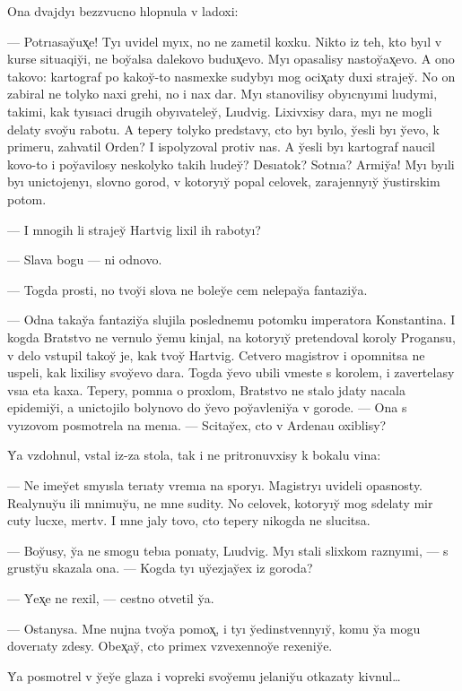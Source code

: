 \documentclass[10pt]{book}
\begin{document}
Ona dvajdyı bezzvucno hlopnula v ladoxi:

— Potrıasay̆ux̨e! Tyı uvidel myıx, no ne zametil koxku. Nikto iz teh, kto byıl v kurse situaqiy̆i, ne boy̆alsa dalekovo budux̨evo. Myı opasalisy nastoy̆ax̨evo. A ono takovo: kartograf po kakoy̆-to nasmexke sudybyı mog ocix̨aty duxi strajey̆. No on zabiral ne tolyko naxi grehi, no i nax dar. Myı stanovilisy obyıcnyımi lıudymi, takimi, kak tyısıaci drugih obyıvateley̆, Lıudvig. Lixivxisy dara, myı ne mogli delaty svoy̆u rabotu. A tepery tolyko predstavy, cto byı byılo, y̆esli byı y̆evo, k primeru, zahvatil Orden? I ispolyzoval protiv nas. A y̆esli byı kartograf naucil kovo-to i poy̆avilosy neskolyko takih lıudey̆? Desıatok? Sotnıa? Armiy̆a! Myı byıli byı unictojenyı, slovno gorod, v kotoryıy̆ popal celovek, zarajennyıy̆ y̆ustirskim potom.

— I mnogih li strajey̆ Hartvig lixil ih rabotyı?

— Slava bogu — ni odnovo.

— Togda prosti, no tvoy̆i slova ne boley̆e cem nelepay̆a fantaziy̆a.

— Odna takay̆a fantaziy̆a slujila poslednemu potomku imperatora Konstantina. I kogda Bratstvo ne vernulo y̆emu kinjal, na kotoryıy̆ pretendoval koroly Progansu, v delo vstupil takoy̆ je, kak tvoy̆ Hartvig. Cetvero magistrov i opomnitsa ne uspeli, kak lixilisy svoy̆evo dara. Togda y̆evo ubili vmeste s korolem, i zavertelasy vsıa eta kaxa. Tepery, pomnıa o proxlom, Bratstvo ne stalo jdaty nacala epidemiy̆i, a unictojilo bolynovo do y̆evo poy̆avleniy̆a v gorode. — Ona s vyızovom posmotrela na menıa. — Scitay̆ex, cto v Ardenau oxiblisy?

Y̆a vzdohnul, vstal iz-za stola, tak i ne pritronuvxisy k bokalu vina:

— Ne imey̆et smyısla terıaty vremıa na sporyı. Magistryı uvideli opasnosty. Realynuy̆u ili mnimuy̆u, ne mne sudity. No celovek, kotoryıy̆ mog sdelaty mir cuty lucxe, mertv. I mne jaly tovo, cto tepery nikogda ne slucitsa.

— Boy̆usy, y̆a ne smogu tebıa ponıaty, Lıudvig. Myı stali slixkom raznyımi, — s grusty̆u skazala ona. — Kogda tyı uy̆ezjay̆ex iz goroda?

— Y̆ex̨e ne rexil, — cestno otvetil y̆a.

— Ostanysa. Mne nujna tvoy̆a pomox̨, i tyı y̆edinstvennyıy̆, komu y̆a mogu doverıaty zdesy. Obex̨ay̆, cto primex vzvexennoy̆e rexeniy̆e.

Y̆a posmotrel v y̆ey̆e glaza i vopreki svoy̆emu jelaniy̆u otkazaty kivnul…
\end{document}
